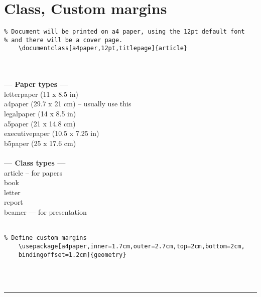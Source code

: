 \documentclass[a4paper,12pt,titlepage]{article}
\begin{document}
\section{Class, Custom margins}
\begin{lstlisting}
% Document will be printed on a4 paper, using the 12pt default font
% and there will be a cover page.
	\documentclass[a4paper,12pt,titlepage]{article}
\end{lstlisting}
~\\
\\
\hspace*{10mm}\textbf{--- Paper types ---}
\\\hspace*{10mm}letterpaper (11 x 8.5 in)
\\\hspace*{10mm}a4paper (29.7 x 21 cm) -- usually use this
\\\hspace*{10mm}legalpaper (14 x 8.5 in)
\\\hspace*{10mm}a5paper (21 x 14.8 cm)
\\\hspace*{10mm}executivepaper (10.5 x 7.25 in)
\\\hspace*{10mm}b5paper (25 x 17.6 cm)
\\
\\
\hspace*{10mm}\textbf{--- Class types ---}
\\\hspace*{10mm}article -- for papers
\\\hspace*{10mm}book
\\\hspace*{10mm}letter
\\\hspace*{10mm}report
\\\hspace*{10mm}beamer --- for presentation
\\
\\
\begin{lstlisting}
% Define custom margins
	\usepackage[a4paper,inner=1.7cm,outer=2.7cm,top=2cm,bottom=2cm,
	bindingoffset=1.2cm]{geometry}
\end{lstlisting}
~\\
\\
\rule{\linewidth}{0.1mm}
\end{document}
